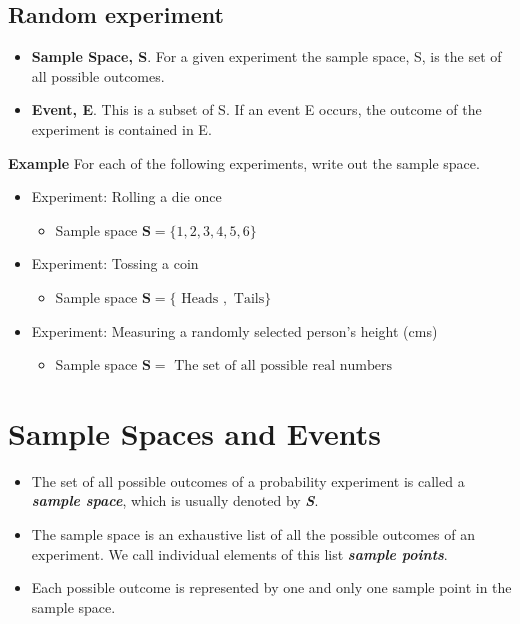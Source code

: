 \documentclass[]{report}
\begin{document}
{\subsection*{Random experiment}
\begin{itemize}
\item \textbf{Sample Space, S}. For a given experiment the sample space, S, is the set of all
possible outcomes.
\item \textbf{Event, E}. This is a subset of S. If an event E occurs, the outcome of the
experiment is contained in E.
\end{itemize}




\begin{framed}
\textbf{Example} 
For each of the following experiments, write out the sample space.
\begin{itemize}
\item  Experiment: Rolling a die once
\begin{itemize}
\item  Sample space $\boldsymbol{S} = \{1,2,3,4,5,6 \}$ \end{itemize}
\item  Experiment:  Tossing a coin
\begin{itemize}
\item  Sample space $\boldsymbol{S} = \{\mbox{ Heads },\mbox{ Tails} \}$ \end{itemize}
\item  Experiment:  Measuring a randomly selected person's height (cms)
\begin{itemize} \item  Sample space $\boldsymbol{S} = \mbox{ The set of all possible real numbers }$
\end{itemize}\end{itemize}
\end{framed}




\section{Sample Spaces and Events}

\begin{itemize}
\item The set of all possible outcomes of a probability experiment is called a
\textbf{\emph{sample space}}, which is usually denoted by \textbf{\emph{S}}.
\item The sample space is an exhaustive list of all the possible outcomes of an
experiment. We call individual elements of this list \textbf{\emph{sample points}}.
\item Each possible outcome is represented by one and only one sample point
in the sample space.
\end{itemize}


}
\end{document}
